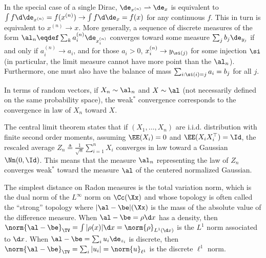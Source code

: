 \begin{rem}\label{rem-weak-conv-disc}
In the special case of a single Dirac, $\de_{x^{(n)}} \rightharpoonup \de_x$ is equivalent to $\int f \d\de_{x^{(n)}} = f(x^{(n)}) \rightarrow \int f \d\de_{x} = f(x)$ for any continuous $f$. This in turn is equivalent to $x^{(n)} \rightarrow x$. More generally, a sequence of discrete measures of the form $\al_n \eqdef \sum_k a_i^{(n)} \de_{ x_i^{(n)} }$ converges toward some measure $\sum_j b_j \de_{y_j}$ if and only if $a_i^{(n)} \rightarrow a_i$, and for those $a_i>0$, $x_i^{(n)} \rightarrow y_{\si(j)}$ for some injection $\si$ (in particular, the limit measure cannot have more point than the $\al_n$). Furthermore, one must also have the balance of mass $\sum_{i : \si(i)=j} a_i = b_j$ for all $j$.

\end{rem}

In terms of random vectors, if $X_n \sim \al_n$ and $X \sim \al$ (not necessarily defined on the same probability space), the weak$^*$ convergence corresponds to the convergence in law of $X_n$ toward $X$.

\begin{rem}\label{rem-clt}
	The central limit theorem states that if $(X_1,\ldots,X_n)$ are i.i.d. distribution with finite second order moments, assuming $\EE(X_i)=0$ and $\EE(X_i X_i^\top)=\Id$, the rescaled average $Z_n \triangleq \frac{1}{\sqrt{n}} \sum_{i=1}^n X_i$ converges in law toward a Gaussian $\Nn(0,\Id)$. This means that the measure $\al_n$ representing the law of $Z_n$ converges weak$^*$ toward the measure $\al$ of the centered normalized Gaussian.
\end{rem}

\begin{defn}
The simplest distance on Radon measures is the total variation norm, which is the dual norm of the $L^\infty$ norm on $\Cc(\Xx)$ and whose topology is often called the ``strong'' topology
where $|\al-\be|(\Xx)$ is the mass of the absolute value of the difference measure. When $\al-\be=\rho \d x$ has a density, then $\norm{\al-\be}_{\TV}=\int |\rho(x)| \d x=\norm{\rho}_{L^1(\d x)}$ is the $L^1$ norm associated to $\d x$. When $\al-\be=\sum_i u_i \de_{z_i}$ is discrete, then $\norm{\al-\be}_{\TV}=\sum_i |u_i|=\norm{u}_{\ell^1}$ is the discrete $\ell^1$ norm. 
\end{defn}

